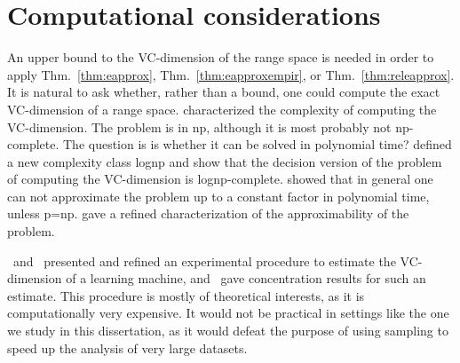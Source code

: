 \section{Computational considerations}\label{sec:vccomputcons}
An upper bound to the VC-dimension of the range space is needed in order to
apply Thm.~\ref{thm:eapprox}, Thm.~\ref{thm:eapproxempir}, or
Thm.~\ref{thm:releapprox}. It is natural to ask whether, rather than a bound, one
could compute the exact VC-dimension of a range space. \citet{PapadimitriouY96}
characterized the complexity of computing the VC-dimension. The problem is in
{\sc np}, although it is most probably not {\sc np}-complete. The question is is
whether it can  be solved in polynomial time? \citet{PapadimitriouY96} defined a
new complexity class {\sc lognp} and show that the decision version of the
problem of computing the VC-dimension is {\sc lognp}-complete.
\citet{Schaefer99} showed that in general one can not approximate the problem up
to a constant factor in polynomial time, unless {\sc p}={\sc np}.
\citet{MosselU01} gave a refined characterization of the approximability of the
problem.

\citet{VapnikLLC94}~and~\citet{ShaoCL00} presented and refined an experimental
procedure to estimate the VC-dimension of a learning machine,
and~\citet{McDonaldSS11} gave concentration results for such an estimate. This
procedure is mostly of theoretical interests, as it is computationally very
expensive. It would not be practical in settings like the one we study in this
dissertation, as it would defeat the purpose of using sampling to speed up the
analysis of very large datasets.

